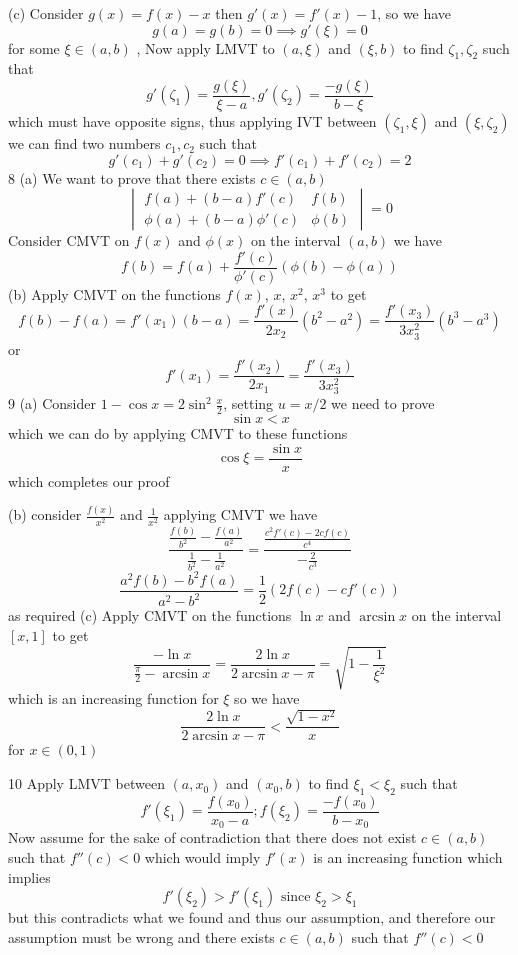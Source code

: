 \documentclass[12pt]{article}
\begin{document}
(c) Consider $g(x)= f(x)-x$ then $g'(x) = f'(x)-1$, so we have
$$
g(a) = g(b) = 0 \implies g'(\xi) = 0
$$
for some $\xi \in(a,b)$ , Now apply LMVT to $(a,\xi)$ and $(\xi, b)$ to find $\zeta_{1}, \zeta_{2}$ such that
$$
g'(\zeta_{1}) = \frac{g(\xi)}{\xi-a}, g'(\zeta_{2}) = \frac{-g(\xi)}{b-\xi}
$$
which must have opposite signs, thus applying IVT between $(\zeta_{1}, \xi)$ and $(\xi,\zeta_{2})$ we can find two numbers $c_{1}, c_{2}$ such that
$$
\boxed{
g'(c_{1})+ g'(c_{2}) = 0 \implies f'(c_{1}) + f'(c_{2}) = 2
}
$$
8 (a)
We want to prove that there exists $c \in(a,b)$
$$
\begin{vmatrix}
f(a) + (b-a)f'(c) & f(b) \\
\phi(a) + (b-a)\phi'(c) & \phi(b) 
\end{vmatrix}=0
$$
Consider CMVT on $f(x)$ and $\phi(x)$ on the interval $(a, b)$ we have
$$
f(b) = f(a) + \frac{f'(c)}{\phi'(c)} (\phi(b)-\phi(a))
$$
(b) Apply CMVT on the functions $f(x)$, $x$, $x^{2}$, $x^{3}$ to get
$$
f(b)-f(a) = f'(x_{1})(b-a) = \frac{f'(x)}{2x_{2}}(b^{2}-a^{2}) = \frac{f'(x_{3})}{3x_{3}^{2}}(b^{3}-a^{3})
$$
or
$$
f'(x_{1})=\frac{f'(x_{2})}{2x_{1}} = \frac{f'(x_{3})}{3x_{3}^{2}}
$$
9
(a)
Consider $1-\cos x = 2\sin ^{2} \frac{x}{2}$, setting $u = x/2$ we need to prove 
$$
\sin x < x
$$
which we can do by applying CMVT to these functions
$$
\cos \xi = \frac{\sin x }{x}
$$
which completes our proof

(b) consider $\frac{f(x)}{x^{2}}$ and $\frac{1}{x^{2}}$ applying CMVT we have
$$
\frac{\frac{f(b)}{b^{2}}-\frac{f(a)}{a^{2}}}{\frac{1}{b^{2}}-\frac{1}{a^{2}}} = \frac{\frac{c^{2}f'(c) - 2cf(c)}{c^{4}}}{-\frac{2}{c^{3}}}
$$
$$
\frac{a^{2}f(b)-b^{2}f(a)}{a^{2}-b^{2}} = \frac{1}{2} (2f(c)-cf'(c))
$$
as required
(c)
Apply CMVT on the functions $\ln x$ and $\arcsin x$ on the interval $[x,1]$ to get
$$
\frac{-\ln x}{\frac{\pi}{2}-\arcsin x} = \frac{2\ln x}{2\arcsin x-\pi} = \sqrt{ 1-\frac{1}{\xi^{2}} }
$$
which is an increasing function for $\xi$ so we have
$$
\frac{2\ln x}{2\arcsin x-\pi} < \frac{\sqrt{ 1-x^{2} }}{x}
$$
for $x \in (0,1)$

10
Apply LMVT between $(a,x_{0})$ and $(x_{0}, b)$ to find $\xi_{1}<\xi_{2}$ such that
$$
f'(\xi_{1}) = \frac{f(x_{0})}{x_{0}-a}; f(\xi_{2}) = \frac{-f(x_{0})}{b-x_{0}}
$$
Now assume for the sake of contradiction that there does not exist $c \in (a,b)$ such that $f''(c)<0$ which would imply $f'(x)$ is an increasing function which implies
$$
f'(\xi_{2}) > f'(\xi_{1}) \text{ since } \xi_{2}>\xi_{1}
$$
but this contradicts what we found and thus our assumption, and therefore our assumption must be wrong and there exists $c \in (a,b)$ such that $f''(c)<0$
\end{document}
